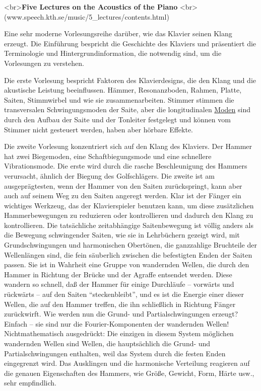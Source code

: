 \label{Lectures}

<br>\textbf{Five Lectures on the Acoustics of the Piano}
<br>(www.speech.kth.se/music/5\_lectures/contents.html)

Eine sehr moderne Vorlesungsreihe darüber, wie das Klavier seinen Klang erzeugt.
Die Einführung bespricht die Geschichte des Klaviers und präsentiert die Terminologie und Hintergrundinformation, die notwendig sind, um die Vorlesungen zu verstehen.

Die erste Vorlesung bespricht Faktoren des Klavierdesigns, die den Klang und die akustische Leistung beeinflussen.
Hämmer, Resonanzboden, Rahmen, Platte, Saiten, Stimmwirbel und wie sie zusammenarbeiten.
Stimmer stimmen die transversalen Schwingungsmoden der Saite, aber die longitudinalen \hyperref[moden]{Moden} sind durch den Aufbau der Saite und der Tonleiter festgelegt und können vom Stimmer nicht gesteuert werden, haben aber hörbare Effekte.

Die zweite Vorlesung konzentriert sich auf den Klang des Klaviers.
Der Hammer hat zwei Biegemoden, eine Schaftbiegungsmode und eine schnellere Vibrationsmode.
Die erste wird durch die rasche Beschleunigung des Hammers verursacht, ähnlich der Biegung des Golfschlägers.
Die zweite ist am ausgeprägtesten, wenn der Hammer von den Saiten zurückspringt, kann aber auch auf seinem Weg zu den Saiten angeregt werden.
Klar ist der Fänger ein wichtiges Werkzeug, das der Klavierspieler benutzen kann, um diese zusätzlichen Hammerbewegungen zu reduzieren oder kontrollieren und dadurch den Klang zu kontrollieren.
Die tatsächliche zeitabhängige Saitenbewegung ist völlig anders als die Bewegung schwingender Saiten, wie sie in Lehrbüchern gezeigt wird, mit Grundschwingungen und harmonischen Obertönen, die ganzzahlige Bruchteile der Wellenlängen sind, die fein säuberlich zwischen die befestigten Enden der Saiten passen.
Sie ist in Wahrheit eine Gruppe von wandernden Wellen, die durch den Hammer in Richtung der Brücke und der Agraffe entsendet werden.
Diese wandern so schnell, daß der Hammer für einige Durchläufe -- vorwärts und rückwärts -- auf den Saiten \enquote{steckenbleibt}, und es ist die Energie einer dieser Wellen, die auf den Hammer treffen, die ihn schließlich in Richtung Fänger zurückwirft.
Wie werden nun die Grund- und Partialschwingungen erzeugt?
Einfach -- sie sind nur die Fourier-Komponenten der wandernden Wellen!
Nichtmathematisch ausgedrückt: Die einzigen in diesem System möglichen wandernden Wellen sind Wellen, die hauptsächlich die Grund- und Partialschwingungen enthalten, weil das System durch die festen Enden eingegrenzt wird.
Das Ausklingen und die harmonische Verteilung reagieren auf die genauen Eigenschaften des Hammers, wie Größe, Gewicht, Form, Härte usw., sehr empfindlich.

